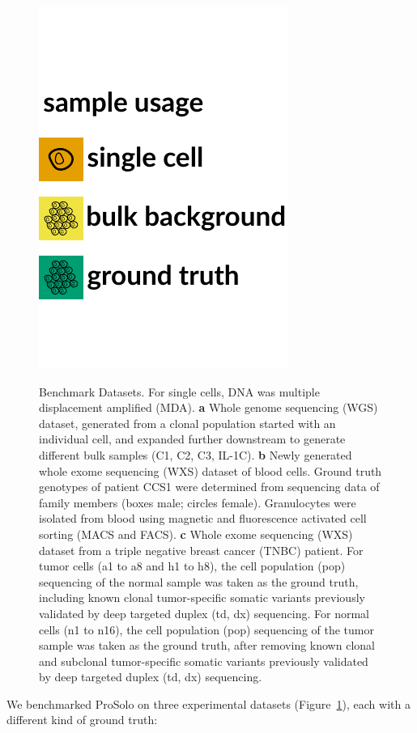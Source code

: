 \documentclass[12pt,inline]{wlscirep}
\begin{document}
\begin{figure}[!tpb]
\begin{minipage}{.5\linewidth}
  \end{minipage}
  \hspace{6ex}
  \begin{minipage}{.3\linewidth}
    \includegraphics[height=38ex]{figs/data_overview_color_legend.pdf} \\
  \end{minipage}
  \caption{
   Benchmark Datasets.
   For single cells, DNA was multiple displacement amplified (MDA).
   \textbf{a} Whole genome sequencing (WGS) dataset, generated from a clonal population started with an individual cell\cite{dong_accurate_2017}, and expanded further downstream to generate different bulk samples (C1, C2, C3, IL-1C).
   \textbf{b} Newly generated whole exome sequencing (WXS) dataset of blood cells.
   Ground truth genotypes of patient CCS1 were determined from sequencing data of family members (boxes male; circles female).
   Granulocytes were isolated from blood using magnetic and fluorescence activated cell sorting (MACS and FACS).
   \textbf{c} Whole exome sequencing (WXS) dataset from a triple negative breast cancer (TNBC) patient\cite{wang_clonal_2014}.
   For tumor cells (a1 to a8 and h1 to h8), the cell population (pop) sequencing of the normal sample was taken as the ground truth, including known clonal tumor-specific somatic variants previously validated by deep targeted duplex (td, dx) sequencing\cite{wang_clonal_2014}.
   For normal cells (n1 to n16), the cell population (pop) sequencing of the tumor sample was taken as the ground truth, after removing known clonal and subclonal tumor-specific somatic variants previously validated by deep targeted duplex (td, dx) sequencing\cite{wang_clonal_2014}.
   }
  \label{fig:datasets}
\end{figure}

We benchmarked ProSolo on three experimental datasets (Figure~\ref{fig:datasets}), each with a different kind of ground truth:\\
\end{document}
